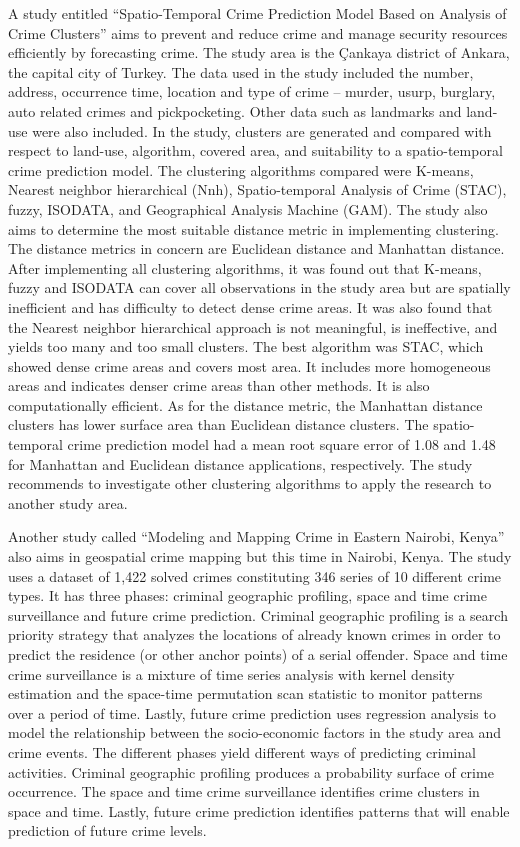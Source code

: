     A study entitled “Spatio-Temporal Crime Prediction Model Based on Analysis of Crime Clusters” \cite{polat2007spatio} aims to prevent and reduce crime and manage security resources efficiently by forecasting crime. The study area is the Çankaya district of Ankara, the capital city of Turkey. The data used in the study included the number, address, occurrence time, location and type of crime – murder, usurp, burglary, auto related crimes and pickpocketing. Other data such as landmarks and land-use were also included. In the study, clusters are generated and compared with respect to land-use, algorithm, covered area, and suitability to a spatio-temporal crime prediction model. The clustering algorithms compared were K-means, Nearest neighbor hierarchical (Nnh), Spatio-temporal Analysis of Crime (STAC), fuzzy, ISODATA, and Geographical Analysis Machine (GAM). The study also aims to determine the most suitable distance metric in implementing clustering. The distance metrics in concern are Euclidean distance and Manhattan distance. After implementing all clustering algorithms, it was found out that K-means, fuzzy and ISODATA can cover all observations in the study area but are spatially inefficient and has difficulty to detect dense crime areas. It was also found that the Nearest neighbor hierarchical approach is not meaningful, is ineffective, and yields too many and too small clusters. The best algorithm was STAC, which showed dense crime areas and covers most area. It includes more homogeneous areas and indicates denser crime areas than other methods. It is also computationally efficient. As for the distance metric, the Manhattan distance clusters has lower surface area than Euclidean distance clusters. The spatio-temporal crime prediction model had a mean root square error of 1.08 and 1.48 for Manhattan and Euclidean distance applications, respectively. The study recommends to investigate other clustering algorithms to apply the research to another study area.

    Another study called “Modeling and Mapping Crime in Eastern Nairobi, Kenya” \cite{mburu2014modeling} also aims in geospatial crime mapping but this time in Nairobi, Kenya. The study uses a dataset of 1,422 solved crimes constituting 346 series of 10 different crime types. It has three phases: criminal geographic profiling, space and time crime surveillance and future crime prediction. Criminal geographic profiling is a search priority strategy that analyzes the locations of already known crimes in order to predict the residence (or other anchor points) of a serial offender. Space and time crime surveillance is a mixture of time series analysis with kernel density estimation and the space-time permutation scan statistic to monitor patterns over a period of time. Lastly, future crime prediction uses regression analysis to model the relationship between the socio-economic factors in the study area and crime events. The different phases yield different ways of predicting criminal activities. Criminal geographic profiling produces a probability surface of crime occurrence. The space and time crime surveillance identifies crime clusters in space and time. Lastly, future crime prediction identifies patterns that will enable prediction of future crime levels.


